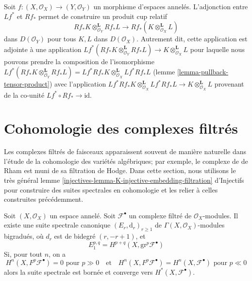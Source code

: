 \begin{remark}

\label{remark-cup-product}
Soit $f : (X, \mathcal{O}_X) \to (Y, \mathcal{O}_Y)$ un morphisme d'espaces annelés. L'adjonction entre $Lf^*$ et $Rf_*$ permet de construire un produit cup relatif $$
Rf_*K \otimes_{\mathcal{O}_Y}^\mathbf{L} Rf_*L
\longrightarrow
Rf_*(K \otimes_{\mathcal{O}_X}^\mathbf{L} L)
$$ dans $D(\mathcal{O}_Y)$ pour tous $K, L$ dans $D(\mathcal{O}_X)$. Autrement dit, cette application est adjointe à une application $Lf^*(Rf_*K \otimes_{\mathcal{O}_Y}^\mathbf{L} Rf_*L) \to
K \otimes_{\mathcal{O}_X}^\mathbf{L} L$ pour laquelle nous pouvons prendre la composition de l'isomorphisme $Lf^*(Rf_*K \otimes_{\mathcal{O}_Y}^\mathbf{L} Rf_*L) =
Lf^*Rf_*K \otimes_{\mathcal{O}_X}^\mathbf{L} Lf^*Rf_*L$ (lemme \ref{lemma-pullback-tensor-product}) avec l'application $Lf^*Rf_*K \otimes_{\mathcal{O}_X}^\mathbf{L} Lf^*Rf_*L
\to K \otimes_{\mathcal{O}_X}^\mathbf{L} L$ provenant de la co-unité $Lf^* \circ Rf_* \to \text{id}$.
\end{remark}





\section{Cohomologie des complexes filtrés}

\label{section-cohomology-filtered-object}

\noindent
Les complexes filtrés de faisceaux apparaissent souvent de manière naturelle dans l'étude de la cohomologie des variétés algébriques; par exemple, le complexe de de Rham est muni de sa filtration de Hodge. Dans cette section, nous utilisons le très général lemme \ref{injectives-lemma-K-injective-embedding-filtration} d'Injectifs pour construire des suites spectrales en cohomologie et les relier à celles construites précédemment.

\begin{lemma}

\label{lemma-spectral-sequence-filtered-object}

Soit $(X, \mathcal{O}_X)$ un espace annelé. Soit $\mathcal{F}^\bullet$ un complexe filtré de $\mathcal{O}_X$-modules. Il existe une suite spectrale canonique $(E_r, \text{d}_r)_{r \geq 1}$ de
$\Gamma(X, \mathcal{O}_X)$-modules bigradués, où $d_r$ est de bidegré $(r, -r + 1)$, et
$$
E_1^{p, q} = H^{p + q}(X, \text{gr}^p\mathcal{F}^\bullet)
$$
Si, pour tout $n$, on a
$$
H^n(X, F^p\mathcal{F}^\bullet) = 0\text{ pour }p \gg 0
\quad\text{et}\quad
H^n(X, F^p\mathcal{F}^\bullet) = H^n(X, \mathcal{F}^\bullet)\text{ pour }p \ll 0
$$
alors la suite spectrale est bornée et converge vers
$H^*(X, \mathcal{F}^\bullet)$.

\end{lemma}

